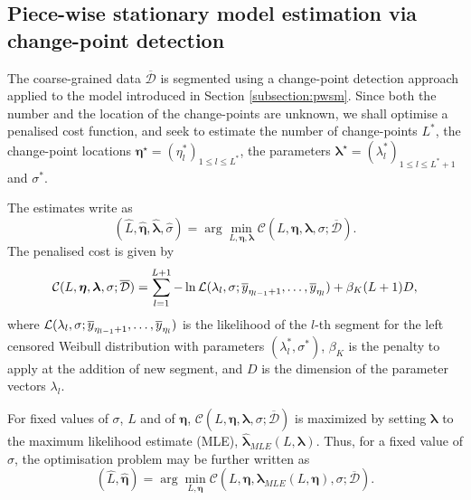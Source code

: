 \subsection{Piece-wise stationary model estimation via change-point detection}\label{subsection:pelt}

The coarse-grained data $\overline{\mathcal{D}}$ is segmented using a change-point detection approach applied to the model introduced in Section \ref{subsection:pwsm}. 
Since both the number and the location of the change-points are unknown, we shall optimise a penalised cost function, and seek to estimate the number of change-points $L^*$, the change-point locations $\bm{\eta}^\star= (\eta^*_l)_{1\leq l\leq L^*}$, the parameters $\bm{\lambda}^\star= (\lambda^*_l)_{1\leq l\leq L^*+1}$ and $\sigma^*$. 

\noindent The estimates write as
\begin{equation}
(\widehat{L}, \widehat{\bm{\eta}}, \widehat{\bm{\lambda}},\widehat{\sigma}) = \arg \min_{L, \bm{\eta}, \bm{\lambda}} \mathcal{C}(L,  \bm{\eta}, \bm{\lambda},\sigma;   \overline{\mathcal{D}}).
\end{equation}
The penalised cost is given by
\begin{equation}\label{eq:pencost}
\mathcal{C}(L,  \bm{\eta}, \bm{\lambda},\sigma;   \overline{\mathcal{D}})=\sum_{l=1}^{L+1}  -\ln \mathcal L(\lambda_l,\sigma; \overline{y}_{\eta_{l-1}+1}, \ldots, \overline{y}_{\eta_l}) + \beta_K(L+1)D,
\end{equation}
where $\mathcal L(\lambda_l,\sigma; \overline{y}_{\eta_{l-1}+1}, \ldots, \overline{y}_{\eta_l})$ is the likelihood of the $l$-th segment for the left censored Weibull distribution with parameters $(\lambda^*_l,\sigma^*)$, $\beta_K$ is the penalty to apply at the addition of new segment, and $D$ is the dimension of the parameter vectors $\lambda_l$. %

For fixed values of $\sigma$, $L$ and of $\bm{\eta}$, $\mathcal{C}(L,  \bm{\eta}, \bm{\lambda}, \sigma;   \overline{\mathcal{D}})$ is maximized by setting $\bm{\lambda}$ to the maximum likelihood estimate (MLE), $\widehat{\bm{\lambda}}_{MLE}(L, \bm{\lambda})$.  Thus, for a fixed value of $\sigma$, the optimisation problem may be further written as 
\begin{equation}\label{mle:crit}
(\widehat{L}, \widehat{\bm{\eta}}) = \arg \min_{L, \bm{\eta}} \mathcal{C}(L,  \bm{\eta}, \widehat{\bm{\lambda}}_{MLE}(L, \bm{\eta}),\sigma;   \overline{\mathcal{D}}).
\end{equation}

